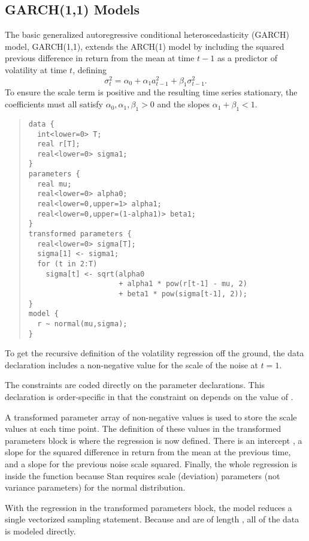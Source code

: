 \subsection{GARCH(1,1) Models}

The basic generalized autoregressive conditional heteroscedasticity
(GARCH) model, GARCH(1,1), extends the ARCH(1) model by including the
squared previous difference in return from the mean at time $t-1$ as a
predictor of volatility at time $t$, defining
%
\[
\sigma^2_t = \alpha_0 + \alpha_1 a^2_{t-1} + \beta_1 \sigma^2_{t-1}.
\]
%
To ensure the scale term is positive and the resulting time series
stationary, the coefficients must all satisfy $\alpha_0, \alpha_1,
\beta_1 > 0$ and the slopes $\alpha_1 + \beta_1 < 1$.
%
\begin{quote}
\begin{Verbatim}[fontsize=\small]
data {
  int<lower=0> T; 
  real r[T];
  real<lower=0> sigma1; 
}
parameters {
  real mu; 
  real<lower=0> alpha0;          
  real<lower=0,upper=1> alpha1;  
  real<lower=0,upper=(1-alpha1)> beta1; 
}
transformed parameters {
  real<lower=0> sigma[T];
  sigma[1] <- sigma1;
  for (t in 2:T)
    sigma[t] <- sqrt(alpha0 
                     + alpha1 * pow(r[t-1] - mu, 2)
                     + beta1 * pow(sigma[t-1], 2));
}
model {
  r ~ normal(mu,sigma);
}
\end{Verbatim}
\end{quote}
%
To get the recursive definition of the volatility regression off the
ground, the data declaration includes a non-negative value 
 for the scale of the noise at $t = 1$. 

The constraints are coded directly on the parameter declarations.
This declaration is order-specific in that the constraint on 
depends on the value of . 

A transformed parameter array of non-negative values  is
used to store the scale values at each time point.  The definition of
these values in the transformed parameters block is where the
regression is now defined.  There is an intercept , a
slope  for the squared difference in return from the mean
at the previous time, and a slope  for the previous noise
scale squared.  Finally, the whole regression is inside the
 function because Stan requires scale (deviation) parameters (not
variance parameters) for the normal distribution.

With the regression in the transformed parameters block, the model
reduces a single vectorized sampling statement.  Because  and
 are of length , all of the data is modeled
directly.


